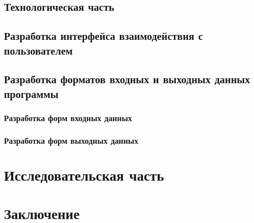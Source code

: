 \documentclass[russian,utf8,emptystyle]{eskdtext}
\begin{document}
\subsection{Технологическая часть}
\subsection{Разработка интерфейса взаимодействия с пользователем}

\subsection{Разработка форматов входных и выходных данных программы}
\subsubsection{Разработка форм входных данных}

\subsubsection{Разработка форм выходных данных}

\newpage
\section{Исследовательская часть}

\newpage
\section{Заключение}

\newpage
\end{document}
